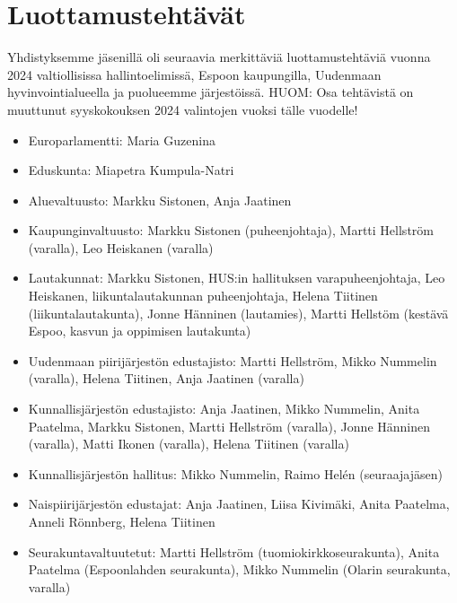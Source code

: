 \documentclass[a4paper,12pt]{article}
\begin{document}
\section{Luottamustehtävät}
Yhdistyksemme jäsenillä oli seuraavia merkittäviä luottamustehtäviä vuonna 2024 valtiollisissa hallintoelimissä, Espoon kaupungilla, Uudenmaan hyvinvointialueella ja puolueemme järjestöissä. HUOM: Osa tehtävistä on muuttunut syyskokouksen 2024 valintojen vuoksi tälle vuodelle!
\begin{itemize}
\item{Europarlamentti:} Maria Guzenina
\item{Eduskunta:} Miapetra Kumpula-Natri
\item{Aluevaltuusto:} Markku Sistonen, Anja Jaatinen
\item{Kaupunginvaltuusto:} Markku Sistonen (puheenjohtaja), Martti Hellström (varalla), Leo Heiskanen (varalla)
\item{Lautakunnat:} Markku Sistonen, HUS:in hallituksen varapuheenjohtaja, Leo Heiskanen, liikuntalautakunnan puheenjohtaja, Helena Tiitinen (liikuntalautakunta), Jonne Hänninen (lautamies), Martti Hellstöm (kestävä Espoo, kasvun ja oppimisen lautakunta)
\item{Uudenmaan piirijärjestön edustajisto:} Martti Hellström, Mikko Nummelin (varalla), Helena Tiitinen, Anja Jaatinen (varalla)
\item{Kunnallisjärjestön edustajisto:} Anja Jaatinen, Mikko Nummelin, Anita Paatelma, Markku Sistonen, Martti Hellström (varalla), Jonne Hänninen (varalla), Matti Ikonen (varalla), Helena Tiitinen (varalla)
\item{Kunnallisjärjestön hallitus:} Mikko Nummelin, Raimo Helén (seuraajajäsen)
\item{Naispiirijärjestön edustajat:} Anja Jaatinen, Liisa Kivimäki, Anita Paatelma, Anneli Rönnberg, Helena Tiitinen
\item{Seurakuntavaltuutetut:} Martti Hellström (tuomiokirkkoseurakunta), Anita Paatelma (Espoonlahden seurakunta), Mikko Nummelin (Olarin seurakunta, varalla)
\end{itemize}
\end{document}
